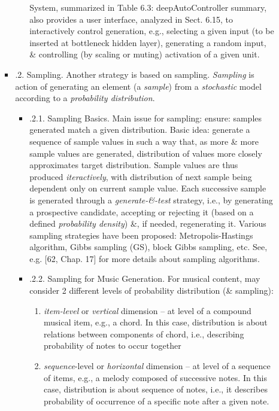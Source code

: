 \documentclass{article}
\begin{document}
\begin{itemize}
\begin{itemize}
\begin{itemize}
\begin{itemize}
				System, summarized in {\sf Table 6.3: deepAutoController summary}, also provides a user interface, analyzed in Sect. 6.15, to interactively control generation, e.g., selecting a given input (to be inserted at bottleneck hidden layer), generating a random input, \& controlling (by scaling or muting) activation of a given unit.
			\end{itemize}
			\item {.2. Sampling.} Another strategy is based on sampling. {\it Sampling} is action of generating an element (a {\it sample}) from a {\it stochastic} model according to a {\it probability distribution}.
			\begin{itemize}
				\item {.2.1. Sampling Basics.} Main issue for sampling: ensure: samples generated match a given distribution. Basic idea: generate a sequence of sample values in such a way that, as more \& more sample values are generated, distribution of values more closely approximates target distribution. Sample values are thus produced {\it iteractively}, with distribution of next sample being dependent only on current sample value. Each successive sample is generated through a {\it generate-\&-test} strategy, i.e., by generating a prospective candidate, accepting or rejecting it (based on a defined {\it probability density}) \&, if needed, regenerating it. Various sampling strategies have been proposed: Metropolis-Hastings algorithm, Gibbs sampling (GS), block Gibbs sampling, etc. See, e.g. [62, Chap. 17] for more details about sampling algorithms.
				\item {.2.2. Sampling for Music Generation.} For musical content, may consider 2 different levels of probability distribution (\& sampling):
				\begin{enumerate}
					\item {\it item-level} or {\it vertical} dimension -- at level of a compound musical item, e.g., a chord. In this case, distribution is about relations between components of chord, i.e., describing probability of notes to occur together
					\item {\it sequence}-level or {\it horizontal} dimension -- at level of a sequence of items, e.g., a melody composed of successive notes. In this case, distribution is about sequence of notes, i.e., it describes probability of occurrence of a specific note after a given note.
				\end{enumerate}

\end{itemize}
\end{itemize}
\end{itemize}
\end{itemize}
\end{document}
